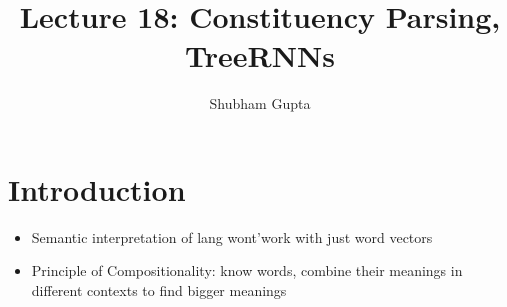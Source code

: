 \documentclass[a4paper]{article}
\title{Lecture 18: Constituency Parsing, TreeRNNs}
\author{Shubham Gupta}
\begin{document}
\maketitle
\section{Introduction}
\begin{itemize}
    \item Semantic interpretation of lang wont'work with just word vectors
    \item Principle of Compositionality: know words, combine their meanings in different contexts to find bigger meanings
\end{itemize}
\end{document}
